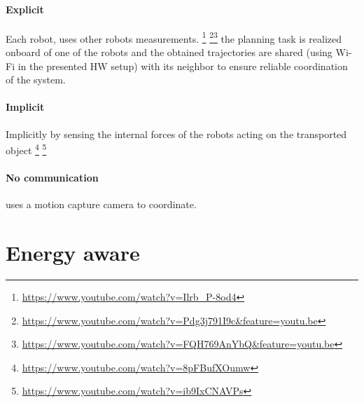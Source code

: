 \documentclass{article}
\begin{document}
		\paragraph{Explicit} Each robot, uses other robots measurements.
			\cite{loianno-2017-cooperative-transportation-using-small-quadrotors-using-monocular-vision-and-inertial-sensing}\footnote{\url{https://www.youtube.com/watch?v=Ilrb_P-8od4}}
			\cite{masone-2016-cooperative-transportation-of-a-payload-using-quadrotors-a-reconfigurable-cable-driven-parallel-robot}
			\cite{spurny-2019-cooperative-transport-of-large-objects-by-a-pair-of-unmanned-aerial-systems-using-sampling-based-motion-planning}\footnote{\url{https://www.youtube.com/watch?v=Pdg3j791I9c&feature=youtu.be}}\footnote{\url{https://www.youtube.com/watch?v=FQH769AnYbQ&feature=youtu.be}} the planning task is realized onboard of one of the robots and the obtained trajectories are shared (using Wi-Fi in the presented HW setup) with its neighbor to ensure reliable coordination of the system.
			
		\paragraph{Implicit} Implicitly by sensing the internal forces of the robots acting on the transported object
			\cite{tagliabue-2017-robust-collaborative-object-transportation-using-multiple-mavs}
			\cite{tagliabue-2017-collaborative-transportation-using-mavs-via-passive-force-control}
			\cite{gassner-2017-dynamic-collaboration-without-communication-vision-based-cable-suspended-load-transport-with-two-quadrotors}\footnote{\url{https://www.youtube.com/watch?v=8pFBufXOumw}}
			\cite{wu-2020-cooperative-transportation-of-drones-without-inter-agent-communication} \footnote{\url{https://www.youtube.com/watch?v=ib9IxCNAVPs}}
			\cite{thapa-2019-cooperative-aerial-load-transport-with-attitude-stabilization}
		\paragraph{No communication}
			\cite{mohammadi-2018-decentralized-motion-control-in-a-cabled-based-multi-drone-load-transport-system,mohammadi-2020-control-of-multiple-quad-copters-with-a-cable-suspended-payload-subject-to-disturbances} uses a motion capture camera to coordinate. 
	\section{Energy aware}
		\cite{mohiuddin-2020-energy-distribution-in-dual-uav-collaborative-transportation-through-load-sharing}
	
\end{document}
